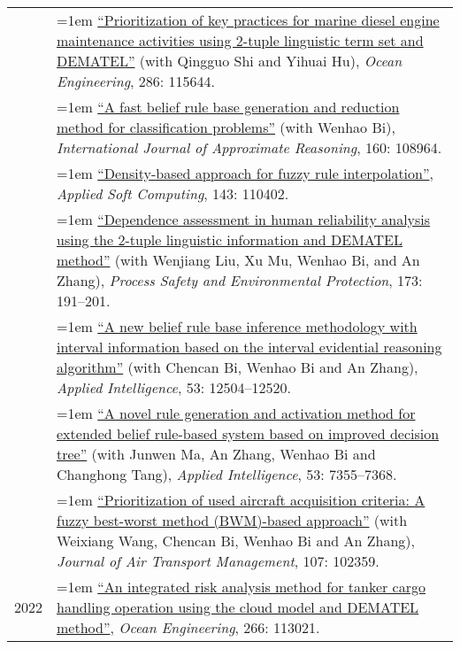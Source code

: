 \documentclass[11pt,english]{article}
\begin{document}
\begin{tabular}{p{.85in}>{\hangindent=1em}p{5.65in}<{\raggedright}}
 &  \href{https://doi.org/10.1016/j.oceaneng.2023.115644}{``Prioritization of key practices for marine diesel engine maintenance activities using 2-tuple linguistic term set and DEMATEL''} (with Qingguo Shi and Yihuai Hu), \textit{Ocean Engineering}, 286: 115644. \\

 &  \href{https://doi.org/10.1016/j.ijar.2023.108964}{``A fast belief rule base generation and reduction method for classification problems''} (with Wenhao Bi), \textit{International Journal of Approximate Reasoning}, 160: 108964. \\

 &  \href{https://doi.org/10.1016/j.asoc.2023.110402}{``Density-based approach for fuzzy rule interpolation''}, \textit{Applied Soft Computing}, 143: 110402. \\

 &  \href{https://doi.org/10.1016/j.psep.2023.03.026}{``Dependence assessment in human reliability analysis using the 2-tuple linguistic information and DEMATEL method''} (with Wenjiang Liu, Xu Mu, Wenhao Bi, and An Zhang), \textit{Process Safety and Environmental Protection}, 173: 191--201. \\

 &  \href{https://doi.org/10.1007/s10489-022-04182-z}{``A new belief rule base inference methodology with interval information based on the interval evidential reasoning algorithm''} (with Chencan Bi, Wenhao Bi and An Zhang), \textit{Applied Intelligence}, 53: 12504--12520. \\

 &  \href{https://doi.org/10.1007/s10489-022-03803-x}{``A novel rule generation and activation method for extended belief rule-based system based on improved decision tree''} (with Junwen Ma, An Zhang, Wenhao Bi and Changhong Tang), \textit{Applied Intelligence}, 53: 7355--7368. \\

 &  \href{https://doi.org/10.1016/j.jairtraman.2023.102359}{``Prioritization of used aircraft acquisition criteria: A fuzzy best-worst method (BWM)-based approach''} (with Weixiang Wang, Chencan Bi, Wenhao Bi and An Zhang), \textit{Journal of Air Transport Management}, 107: 102359. \\
 
2022 &  \href{https://doi.org/10.1016/j.oceaneng.2022.113021}{``An integrated risk analysis method for tanker cargo handling operation using the cloud model and DEMATEL method''}, \textit{Ocean Engineering}, 266: 113021. \\


\end{tabular}
\end{document}
